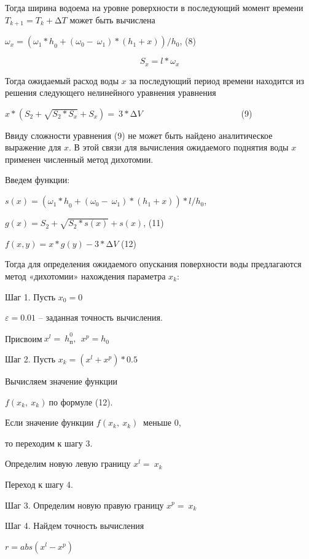 \begin{multicols}{2}
Тогда ширина водоема на уровне роверхности в последующий момент времени
\(T_{k + 1} = T_{k} + \mathrm{\Delta}T\) может быть вычислена

\(\omega_{x} = ({\omega_{1}*h}_{0} + \left( \omega_{0} - \ \omega_{1} \right)*(h_{1} + x))/h_{0}\),
(8)

\[S_{x} = l*\omega_{x}\]

Тогда ожидаемый расход воды \(x\) за последующий период времени
находится из решения следующего нелинейного уравнения уравнения

\(x*\left( S_{2} + \sqrt{S_{2}*S_{x}} + S_{x} \right) = \ 3*\mathrm{\Delta}V\ \ \ \ \ \ \ \ \ \ \ \ \ \ \ \ \ \ \ \ \ \ \ \ \ \ \ \ \ \ \ \ \ \ \ \ \ \ \ \ \ \ \ \ \ \ \ \ \ \ \ \ \)(9)

Ввиду сложности уравнения (9) не может быть найдено аналитическое
выражение для \(x\). В этой связи для вычисления ожидаемого поднятия
воды \(x\ \)применен численный метод дихотомии.

Введем функции\(:\)

\(s(x) = \left( {\omega_{1}*h}_{0} + \left( \omega_{0} - \ \omega_{1} \right)*\left( h_{1} + x \right) \right)*l/h_{0}\),

\(g(x) = S_{2} + \sqrt{S_{2}*s(x)} + s(x)\), (11)

\(f(x,y) = x*g(y) - 3*\mathrm{\Delta}V\) (12)

Тогда для определения ожидаемого опускания поверхности воды предлагаются
метод «дихотомии» нахождения параметра \(x_{k}:\)

Шаг 1. Пусть \(x_{0} = 0\)

\(\varepsilon = 0.01\) -- заданная точность вычисления.

Присвоим\(\ {x^{l} = \ h}_{п}^{0},\ {\ x}^{p} = h_{0}\)

Шаг 2. Пусть \(x_{k} = \left( x^{l} + x^{p} \right)*0.5\)

Вычисляем значение функции

\(f\left( x_{k},\ x_{k} \right)\ \)по формуле (12).

Если значение функции \(f\left( x_{k},\ x_{k} \right)\ \) меньше 0,

то переходим к шагу 3.

Определим новую левую границу \(x^{l} = \ x_{k}\)

Переход к шагу 4.

Шаг 3. Определим новую правую границу \(x^{p} = \ x_{k}\)

Шаг 4. Найдем точность вычисления

\(r = abs\left( x^{l} - x^{p} \right)\)


\end{multicols}
